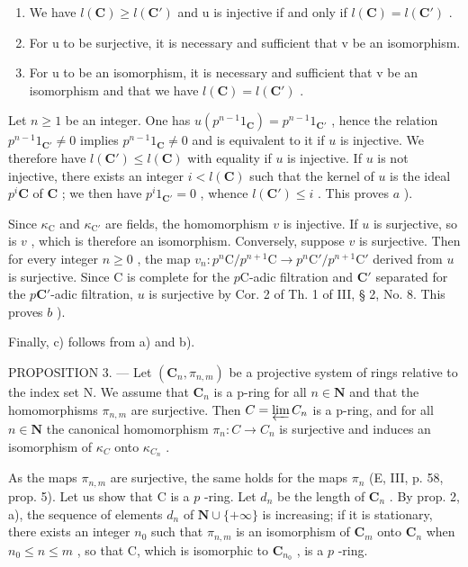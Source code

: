 \begin{enumerate}
\def\labelenumi{\alph{enumi})}
\item
  We have \(l(\mathbf{C}) \geqslant l(\mathbf{C}')\) and u is injective if and only if \(l(\mathbf{C}) = l(\mathbf{C}')\) .
\item
  For u to be surjective, it is necessary and sufficient that v be an isomorphism.
\item
  For u to be an isomorphism, it is necessary and sufficient that v be an isomorphism and that we have \(l(\mathbf{C}) = l(\mathbf{C}')\) .
\end{enumerate}

Let \(n \geqslant 1\) be an integer. One has \(u(p^{n-1}1_{\mathbf{C}}) = p^{n-1}1_{\mathbf{C}'}\) , hence the relation \(p^{n-1}1_{\mathbf{C}'} \neq 0\) implies \(p^{n-1}1_{\mathbf{C}} \neq 0\) and is equivalent to it if \(u\) is injective. We therefore have \(l(\mathbf{C}') \leqslant l(\mathbf{C})\) with equality if \(u\) is injective. If \(u\) is not injective, there exists an integer \(i < l(\mathbf{C})\) such that the kernel of \(u\) is the ideal \(p^i\mathbf{C}\) of \(\mathbf{C}\) ; we then have \(p^i1_{\mathbf{C}'} = 0\) , whence \(l(\mathbf{C}') \leqslant i\) . This proves \(a\) ).

Since \(\kappa_{\mathrm{C}}\) and \(\kappa_{\mathrm{C}'}\) are fields, the homomorphism \(v\) is injective. If \(u\) is surjective, so is \(v\) , which is therefore an isomorphism. Conversely, suppose \(v\) is surjective. Then for every integer \(n \geqslant 0\) , the map \(v_{n}: p^{n}\mathrm{C}/p^{n+1}\mathrm{C} \to p^{n}\mathrm{C}'/p^{n+1}\mathrm{C}'\) derived from \(u\) is surjective. Since C is complete for the \(p\mathrm{C}\)-adic filtration and \(\mathbf{C}'\) separated for the \(p\mathbf{C}'\)-adic filtration, \(u\) is surjective by Cor. 2 of Th. 1 of III, § 2, No. 8. This proves \(b\) ).

Finally, c) follows from a) and b).

PROPOSITION 3. --- Let \((\mathbf{C}_{n}, \pi_{n,m})\) be a projective system of rings relative to the index set N. We assume that \(\mathbf{C}_{n}\) is a p-ring for all \(n \in \mathbf{N}\) and that the homomorphisms \(\pi_{n,m}\) are surjective. Then \(C = \varprojlim C_{n}\) is a p-ring, and for all \(n \in \mathbf{N}\) the canonical homomorphism \(\pi_{n}: C \to C_{n}\) is surjective and induces an isomorphism of \(\kappa_{C}\) onto \(\kappa_{C_{n}}\) .

As the maps \(\pi_{n,m}\) are surjective, the same holds for the maps \(\pi_n\) (E, III, p. 58, prop. 5). Let us show that C is a \(p\) -ring. Let \(d_n\) be the length of \(\mathbf{C}_n\) . By prop. 2, a), the sequence of elements \(d_n\) of \(\mathbf{N} \cup \{+\infty\}\) is increasing; if it is stationary, there exists an integer \(n_0\) such that \(\pi_{n,m}\) is an isomorphism of \(\mathbf{C}_m\) onto \(\mathbf{C}_n\) when \(n_0 \leqslant n \leqslant m\) , so that C, which is isomorphic to \(\mathbf{C}_{n_0}\) , is a \(p\) -ring.

